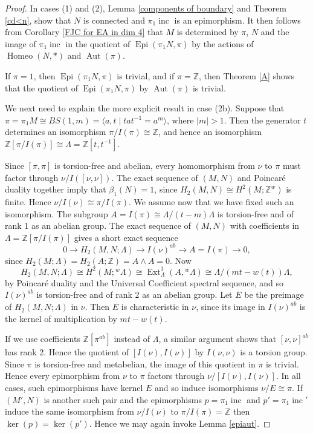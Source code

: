 \documentclass[12pt]{amsart}
\theoremstyle{definition}
\newcommand{\Z}{\mathbb Z}
\DeclareMathOperator{\Aut}{Aut}
\DeclareMathOperator{\Epi}{Epi}
\DeclareMathOperator{\Ext}{Ext}
\DeclareMathOperator{\Homeo}{Homeo}
\DeclareMathOperator{\inc}{inc}
\begin{document}
\begin{proof}
In cases (1) and (2), Lemma \ref{components of boundary} and Theorem \ref{cd<n}, show that $N$ is connected and $
\pi_1\inc$ is an epimorphism.   It then follows from Corollary \ref{FJC for EA in dim 4} that $M$ is determined by $\pi$, $N$ and the image of $\pi_1\inc$ in the quotient
of $\Epi(\pi_1N,\pi)$  by the actions of $\Homeo(N,*)$ and $\Aut(\pi)$.

If $\pi = 1$, then $\Epi(\pi_1N,\pi)$ is trivial, and if $\pi = \Z$, then Theorem \ref{A} shows that the quotient of $\Epi(\pi_1N,\pi)$ by $\Aut(\pi)$ is trivial.



We next need to explain the more explicit result in case (2b).
Suppose that $\pi=\pi_1M\cong{BS(1,m)}=\langle{a,t}\mid{tat^{-1}=a^m}\rangle$,  where $|m|>1$.
Then the generator $t$ determines an isomorphism $\pi/I(\pi)\cong\Z$,
and hence an isomorphism $\Z[\pi/I(\pi)]\cong\Lambda=\Z[t,t^{-1}]$.

Since $[\pi,\pi]$ is torsion-free and abelian, 
every homomorphism from $\nu$ to $\pi$ must factor through $\nu/I([\nu,\nu])$. 
The exact sequence of $(M,N)$ and Poincar\'e duality together imply that $\beta_1(N)=1$,
since $H_2(M,N)\cong{H^2(M;\Z^w)}$ is finite.
Hence $\nu/I(\nu)\cong\pi/I(\pi)$.
We assume now that we have fixed such an isomorphism.
The subgroup $A=I(\pi)\cong\Lambda/(t-m)\Lambda$ is torsion-free and of rank 1 
as an abelian group.
The exact sequence of $(M,N)$ with coefficients in $\Lambda=\Z[\pi/I(\pi)]$ 
gives a short exact sequence
\[
0\to{H_2(M,N;\Lambda)}\to{I(\nu)^{ab}}\to{A=I(\pi)}\to0,
\]
since $H_2(M;\Lambda)=H_2(A;\mathbb{Z})=A\wedge{A}=0$.
Now 
\[
H_2(M,N;\Lambda)\cong{H^2(M;{}^w\Lambda)}\cong
{\Ext^1_\Lambda(A,{}^w\Lambda)}\cong\Lambda/(mt-w(t))\Lambda,
\]
by Poincar\'e duality and the Universal Coefficient spectral sequence,
and so $I(\nu)^{ab}$ is torsion-free and of rank 2 as an abelian group.
Let $E$ be the preimage of $H_2(M,N;\Lambda)$ in $\nu$.
Then $E$ is characteristic in $\nu$, since
its image in $I(\nu)^{ab}$ is the kernel of multiplication by $mt-w(t)$.

If we use coefficients $\Z[\pi^{ab}]$ instead of $\Lambda$,
a similar argument shows that $[\nu,\nu]^{ab}$ has rank 2.
Hence the quotient of $[I(\nu),I(\nu)]$ by $I(\nu,\nu)$ is a torsion group.
Since $\pi$ is torsion-free and metabelian, the image of this quotient in $\pi$ is trivial.
Hence every epimorphism from $\nu$ to $\pi$ factors through $\nu/[I(\nu),I(\nu)]$.
In all cases, such epimorphisms have kernel $E$ and so induce isomorphisms 
$\nu/E\cong\pi$.
If $(M',N)$ is another such pair and the epimorphisms $p=\pi_1\inc$ 
and $p'=\pi_1\inc'$
induce the same isomorphism from $\nu/I(\nu)$ to $\pi/I(\pi)=\Z$ 
then $\ker(p)=\ker(p')$.
Hence we may again invoke Lemma \ref{epiaut}.


\end{proof}
\end{document}
